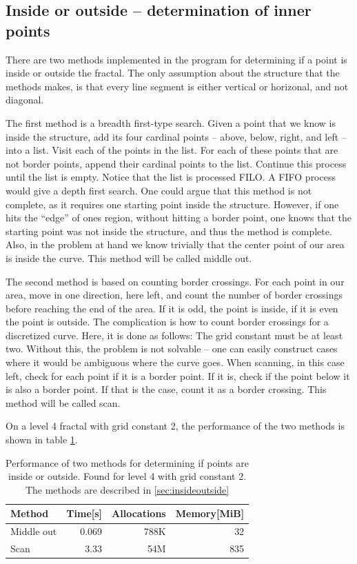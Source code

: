 \documentclass[a4paper, 12pt]{article}
\begin{document}
\subsection{Inside or outside -- determination of inner points\label{sec:insideoutside}}
There are two methods implemented in the program for determining if a point is inside or outside the fractal.
The only assumption about the structure that the methods makes, is that every line segment is either vertical or horizonal, and not diagonal.

The first method is a breadth first-type search.
Given a point that we know is inside the structure, add its four cardinal points -- above, below, right, and left -- into a list.
Visit each of the points in the list.
For each of these points that are not border points, append their cardinal points to the list.
Continue this process until the list is empty.
Notice that the list is processed FILO.
A FIFO process would give a depth first search.
One could argue that this method is not complete, as it requires one starting point inside the structure.
However, if one hits the ``edge'' of ones region, without hitting a border point, one knows that the starting point was not inside the structure, and thus the method is complete.
Also, in the problem at hand we know trivially that the center point of our area is inside the curve.
This method will be called middle out.

The second method is based on counting border crossings.
For each point in our area, move in one direction, here left, and count the number of border crossings before reaching the end of the area.
If it is odd, the point is inside, if it is even the point is outside.
The complication is how to count border crossings for a discretized curve.
Here, it is done as follows:
The grid constant must be at least two.
Without this, the problem is not solvable -- one can easily construct cases where it would be ambiguous where the curve goes.
When scanning, in this case left, check for each point if it is a border point.
If it is, check if the point below it is also a border point.
If that is the case, count it as a border crossing.
This method will be called scan.

On a level 4 fractal with grid constant 2, the performance of the two methods is shown in table \ref{tab:insideoutside}.

\begin{table}[h]
  \centering
\begin{tabular}{lrrr}
  Method& Time[s]& Allocations& Memory[MiB]\\
  \hline
  Middle out& 0.069& 788K& 32\\
  Scan& 3.33& 54M& 835
\end{tabular}
\caption{Performance of two methods for determining if points are inside or outside.
  Found for level 4 with grid constant 2.
  The methods are described in \ref{sec:insideoutside}
  \label{tab:insideoutside}}
\end{table}
\end{document}
